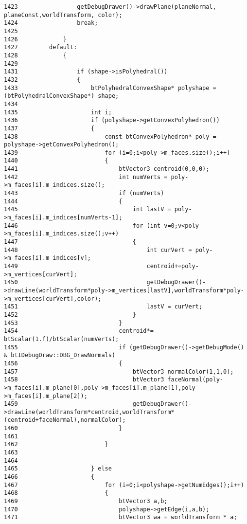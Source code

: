 \begin{Code}
\begin{verbatim}
1423                 getDebugDrawer()->drawPlane(planeNormal, planeConst,worldTransform, color);
1424                 break;
1425 
1426             }
1427         default:
1428             {
1429 
1431                 if (shape->isPolyhedral())
1432                 {
1433                     btPolyhedralConvexShape* polyshape = (btPolyhedralConvexShape*) shape;
1434                     
1435                     int i;
1436                     if (polyshape->getConvexPolyhedron())
1437                     {
1438                         const btConvexPolyhedron* poly = polyshape->getConvexPolyhedron();
1439                         for (i=0;i<poly->m_faces.size();i++)
1440                         {
1441                             btVector3 centroid(0,0,0);
1442                             int numVerts = poly->m_faces[i].m_indices.size();
1443                             if (numVerts)
1444                             {
1445                                 int lastV = poly->m_faces[i].m_indices[numVerts-1];
1446                                 for (int v=0;v<poly->m_faces[i].m_indices.size();v++)
1447                                 {
1448                                     int curVert = poly->m_faces[i].m_indices[v];
1449                                     centroid+=poly->m_vertices[curVert];
1450                                     getDebugDrawer()->drawLine(worldTransform*poly->m_vertices[lastV],worldTransform*poly->m_vertices[curVert],color);
1451                                     lastV = curVert;
1452                                 }
1453                             }
1454                             centroid*= btScalar(1.f)/btScalar(numVerts);
1455                             if (getDebugDrawer()->getDebugMode() & btIDebugDraw::DBG_DrawNormals)
1456                             {
1457                                 btVector3 normalColor(1,1,0);
1458                                 btVector3 faceNormal(poly->m_faces[i].m_plane[0],poly->m_faces[i].m_plane[1],poly->m_faces[i].m_plane[2]);
1459                                 getDebugDrawer()->drawLine(worldTransform*centroid,worldTransform*(centroid+faceNormal),normalColor);
1460                             }
1461                             
1462                         }
1463                         
1464                         
1465                     } else
1466                     {
1467                         for (i=0;i<polyshape->getNumEdges();i++)
1468                         {
1469                             btVector3 a,b;
1470                             polyshape->getEdge(i,a,b);
1471                             btVector3 wa = worldTransform * a;

\end{verbatim}
\end{Code}
